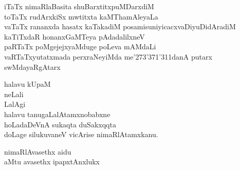 \begin{entry}
\gl{}
\begin{shl}
iTaTx nimaRlaBasita shuBarxtitxpuMDarxdiM\\
toTaTx rudArxkiSx mwtitxta kaMThamAleyaLa\\
vaTaTx rananxda hasatx kaTakadiM posamisuniyicacxvaDiyuDidAradiM\\
kaTiTxdaR honanxGaMTeya pAdadalilxneV\\
paRTaTx poMgejejxyaMduge poLeva mAMdaLi\\
vaRTaTxyutatxmada perxraNeyiMda me\char'273\char'371\char'311danA putarx swMdayaRgAtarx
\end{shl}
\end{entry}

\begin{entry}
\end{entry}

\begin{entry}
\end{entry}

\begin{entry}
\begin{shl}
halavu kUpaM\\
neLali\\
LalAgi\\
halavu tanugaLalAtamxnobabxne\\
hoLadaDeVnA sukaqta duSakxqqta\\
doLage silukuvaneV vicArise nimaRlAtamxkanu.
\end{shl}
\end{entry}

\begin{entry}
\begin{shl}
nimaRlAvasethx aidu\\
aMtu avasethx ipapxtAnxlukx
\end{shl}
\end{entry}

